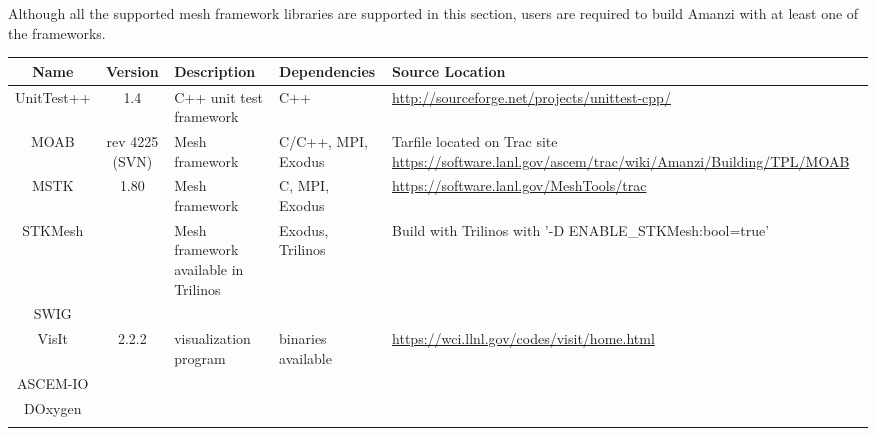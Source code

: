 \documentclass[12pt]{article}
\begin{document}
Although all the supported mesh framework libraries are supported in this section, users are required to build
Amanzi with at least one of the frameworks. 

\begin{table}[htdp]
\begin{center}
\begin{tabular}{|c|c|p{3cm}|p{3cm}|p{3cm}|}
\hline
\hline
Name & Version & Description & Dependencies & Source Location \\
\hline
UnitTest++ & 1.4 & C++ unit test framework & C++ & \url{http://sourceforge.net/projects/unittest-cpp/} \\
\hline
MOAB & rev 4225 (SVN) & Mesh framework & C/C++, MPI, Exodus & Tarfile located on Trac site \url{https://software.lanl.gov/ascem/trac/wiki/Amanzi/Building/TPL/MOAB}  \\
\hline
MSTK & 1.80 & Mesh framework & C, MPI, Exodus & \url{https://software.lanl.gov/MeshTools/trac}\\
\hline
STKMesh & & Mesh framework available in Trilinos & Exodus, Trilinos & Build with Trilinos with '-D ENABLE\_STKMesh:bool=true'  \\
\hline
SWIG &&&& \\
\hline
VisIt & 2.2.2 & visualization program & binaries available &  \url{https://wci.llnl.gov/codes/visit/home.html} \\
\hline
ASCEM-IO &&&& \\
\hline
DOxygen &&&& \\

&&&& \\
\hline


\end{tabular}
\end{center}
\label{default}
\end{table}%
\end{document}
